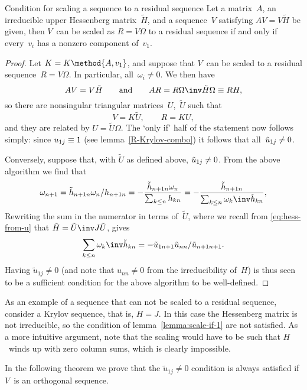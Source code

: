 \documentclass[11pt]{artikel3}
\begin{document}
\begin{Outline}
\begin{llemma}{Condition for scaling a sequence to a residual sequence}
\label{lemma:scale-if-1}
Let a matrix~$A$, an irreducible upper Hessenberg matrix~$\tilde H$, and
a sequence~$V$ satisfying $AV=V\tilde H$ be given, then $V$~can be scaled
as $R=V\Omega$ to a residual sequence if and only if every~$v_i$ has a nonzero
component of~$v_1$.
\end{llemma}
\begin{proof} Let $K=K\method{A,v_1}$, and suppose that $V$~can be scaled
to a residual sequence~$R=V\Omega$. In particular, all~$\omega_i\not=0$.
We then have
\[ AV=V\tilde H\qquad\hbox{and}\qquad AR=R\Omega\inv \tilde H\Omega
                \equiv RH, \]
so there are nonsingular triangular matrices~$U$,~$\tilde U$ such that
\[ V=K\tilde U,\qquad R=KU, \]
and they are related by $U=\tilde U\Omega$.
The `only if' half of the statement now follows simply:
since $u_{1j}\equiv\nobreak1$ (see lemma~\ref{R-Krylov-combo})
it follows that all~$\tilde u_{1j}\not =\nobreak 0$.

Conversely, suppose that, with $\tilde U$ as defined above,
$\tilde u_{1j}\not=\nobreak0$.
From the above algorithm we find that
\[ \omega_{n+1}
    =\tilde h_{n+1n}\omega_n/h_{n+1n}
    =-{\tilde h_{n+1n}\omega_n\over \sum_{k\leq n}h_{kn}}
    =-{\tilde h_{n+1n}\over \sum_{k\leq n}\omega_k\inv \tilde h_{kn}}, \]
Rewriting the sum in the numerator in terms of~$\tilde U$,
where we recall from \eqref{eq:hess-from-u}
that $\tilde H=\tilde U\inv J\tilde U$, gives 
    \[ \sum_{k\leq n}\omega_k\inv \tilde h_{kn} = 
        -\tilde u_{1n+1}\tilde u_{nn}/\tilde u_{n+1n+1}. \]
Having $\tilde u_{1j}\not=0$
(and note that $u_{nn}\not=0$ from the irreducibility of~$H$)
is thus seen to be a sufficient condition
for the above algorithm to be well-defined.\end{proof}

As an example of a sequence that can not be scaled to a residual
sequence, consider a Krylov sequence, that is, $H=J$. 
In this case the Hessenberg matrix is not irreducible, so the
condition of lemma~\ref{lemma:scale-if-1} are not satisfied.
As a more intuitive argument, note that the scaling would have to
be such that $H$~winds up with zero
column sums, which is clearly impossible.

In the following theorem we prove that the $\tilde u_{1j}\not=0$
condition is always satisfied if $V$~is an orthogonal sequence.


\end{Outline}
\end{document}

